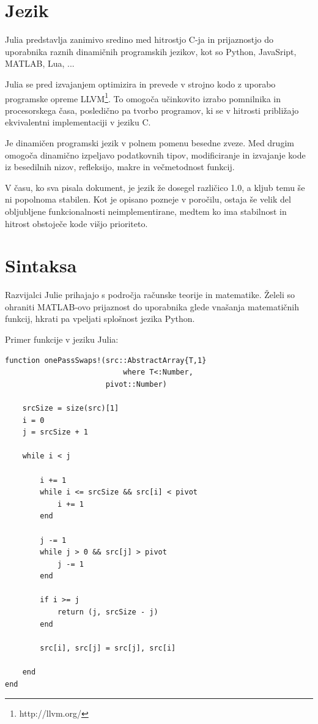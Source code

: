 \documentclass[journal,a4paper,twoside]{sty/IEEEtran}
\begin{document}
\section{Jezik}

Julia predstavlja zanimivo sredino med hitrostjo C-ja in prijaznostjo do uporabnika raznih dinamičnih programskih jezikov, kot so Python, JavaSript,
	MATLAB, Lua, ...

Julia se pred izvajanjem optimizira in prevede v strojno kodo z uporabo programske opreme LLVM\footnote{http://llvm.org/}.
To omogoča učinkovito izrabo pomnilnika in procesorskega časa, posledično pa tvorbo programov, ki se v hitrosti približajo ekvivalentni implementaciji v
	jeziku C.\cite{julia-benchmarks}

Je dinamičen programski jezik v polnem pomenu besedne zveze.
Med drugim omogoča dinamično izpeljavo podatkovnih tipov, modificiranje in izvajanje kode iz besedilnih nizov,\cite{julia-metaprogramming} refleksijo,
	makre in večmetodnost funkcij.

V času, ko sva pisala dokument, je jezik že dosegel različico 1.0, a kljub temu še ni popolnoma stabilen.
Kot je opisano pozneje v poročilu, ostaja še velik del obljubljene funkcionalnosti neimplementirane, medtem ko ima stabilnost in hitrost obstoječe kode
	višjo prioriteto.

\section{Sintaksa}

Razvijalci Julie prihajajo s področja računske teorije in matematike\cite{julia-reasons}.
Želeli so ohraniti MATLAB-ovo prijaznost do uporabnika glede vnašanja matematičnih funkcij, hkrati pa vpeljati splošnost jezika Python.

Primer funkcije v jeziku Julia:
\begin{lstlisting}
function onePassSwaps!(src::AbstractArray{T,1}
                           where T<:Number,
                       pivot::Number)
    
    srcSize = size(src)[1]
    i = 0
    j = srcSize + 1
    
    while i < j
    
        i += 1
        while i <= srcSize && src[i] < pivot
            i += 1
        end
        
        j -= 1
        while j > 0 && src[j] > pivot
            j -= 1
        end
        
        if i >= j
            return (j, srcSize - j)
        end
        
        src[i], src[j] = src[j], src[i]
        
    end
end
\end{lstlisting}
\end{document}
